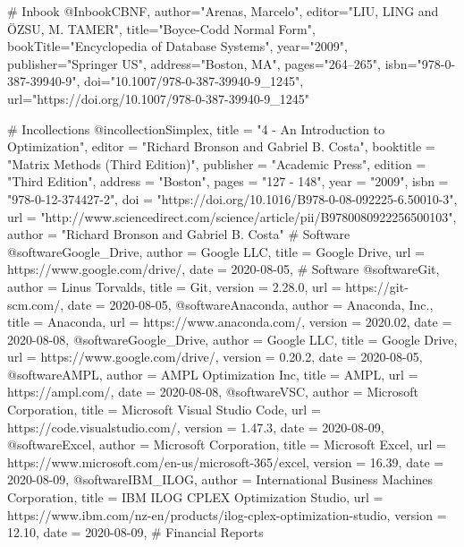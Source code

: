 # Inbook
@Inbook{CBNF,
author="Arenas, Marcelo",
editor="LIU, LING
and {\"O}ZSU, M. TAMER",
title="Boyce-Codd Normal Form",
bookTitle="Encyclopedia of Database Systems",
year="2009",
publisher="Springer US",
address="Boston, MA",
pages="264--265",
isbn="978-0-387-39940-9",
doi="10.1007/978-0-387-39940-9_1245",
url="https://doi.org/10.1007/978-0-387-39940-9_1245"
}

# Incollections
@incollection{Simplex,
title = "4 - An Introduction to Optimization",
editor = "Richard Bronson and Gabriel B. Costa",
booktitle = "Matrix Methods (Third Edition)",
publisher = "Academic Press",
edition = "Third Edition",
address = "Boston",
pages = "127 - 148",
year = "2009",
isbn = "978-0-12-374427-2",
doi = "https://doi.org/10.1016/B978-0-08-092225-6.50010-3",
url = "http://www.sciencedirect.com/science/article/pii/B9780080922256500103",
author = "Richard Bronson and Gabriel B. Costa"
}
# Software
@software{Google_Drive,
  author = {{Google LLC}},
  title = {Google Drive},
  url = {https://www.google.com/drive/},
  date = {2020-08-05},
}
# Software
@software{Git,
  author = {{Linus Torvalds}},
  title = {Git},
  version = {2.28.0},
  url = {https://git-scm.com/},
  date = {2020-08-05},
}
@software{Anaconda,
  author = {{Anaconda, Inc.}},
  title = {Anaconda},
  url = {https://www.anaconda.com/},
  version = {2020.02},
  date = {2020-08-08},
}
@software{Google_Drive,
  author = {{Google LLC}},
  title = {Google Drive},
  url = {https://www.google.com/drive/},
  version = {0.20.2},
  date = {2020-08-05},
}
@software{AMPL,
  author = {{AMPL Optimization Inc}},
  title = {AMPL},
  url = {https://ampl.com/},
  date = {2020-08-08},
}
@software{VSC,
  author = {{Microsoft Corporation}},
  title = {Microsoft Visual Studio Code},
  url = {https://code.visualstudio.com/},
  version = {1.47.3},
  date = {2020-08-09},
}
@software{Excel,
  author = {{Microsoft Corporation}},
  title = {Microsoft Excel},
  url = {https://www.microsoft.com/en-us/microsoft-365/excel},
  version = {16.39},
  date = {2020-08-09},
}
@software{IBM_ILOG,
  author = {{International Business Machines Corporation}},
  title = {IBM ILOG CPLEX Optimization Studio},
  url = {https://www.ibm.com/nz-en/products/ilog-cplex-optimization-studio},
  version = {12.10},
  date = {2020-08-09},
}
# Financial Reports